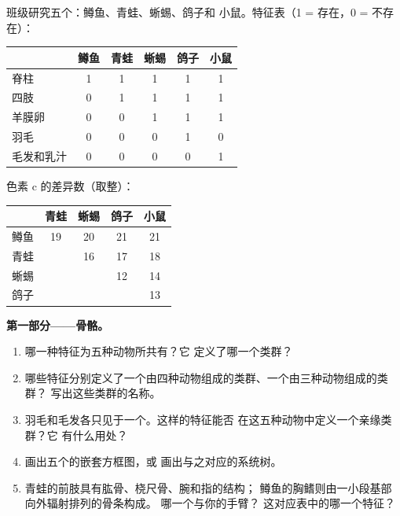 \begin{problem}
\label{pb:g10:common-ancestry:1}
班级研究五个：鳟鱼、青蛙、蜥蜴、鸽子和
小鼠。特征表（1 = 存在，0 = 不存在）：

\begin{center}
\begin{tabular}{lccccc}
 & 鳟鱼 & 青蛙 & 蜥蜴 & 鸽子 & 小鼠 \\ \hline
脊柱 & 1 & 1 & 1 & 1 & 1 \\
四肢 & 0 & 1 & 1 & 1 & 1 \\
羊膜卵 & 0 & 0 & 1 & 1 & 1 \\
羽毛 & 0 & 0 & 0 & 1 & 0 \\
毛发和乳汁 & 0 & 0 & 0 & 0 & 1 \\
\end{tabular}
\end{center}

色素 c 的差异数（取整）：

\begin{center}
\begin{tabular}{lcccc}
 & 青蛙 & 蜥蜴 & 鸽子 & 小鼠 \\ \hline
鳟鱼 & 19 & 20 & 21 & 21 \\
青蛙 & & 16 & 17 & 18 \\
蜥蜴 & & & 12 & 14 \\
鸽子 & & & & 13 \\
\end{tabular}
\end{center}

\medskip
\noindent\textbf{第一部分——骨骼。}
\begin{enumerate}
  \item 哪一种特征为五种动物所共有？它
        定义了哪一个类群？
  \item 哪些特征分别定义了一个由四种动物组成的类群、一个由三种动物组成的类群？
        写出这些类群的名称。
  \item 羽毛和毛发各只见于一个。这样的特征能否
        在这五种动物中定义一个亲缘类群？它
        有什么用处？
  \item 画出五个的嵌套方框图，或
        画出与之对应的系统树。
  \item 青蛙的前肢具有肱骨、桡尺骨、腕和指的结构；
        鳟鱼的胸鳍则由一小段基部向外辐射排列的骨条构成。
        哪一个与你的手臂？
        这对应表中的哪一个特征？
\end{enumerate}


\end{problem}
